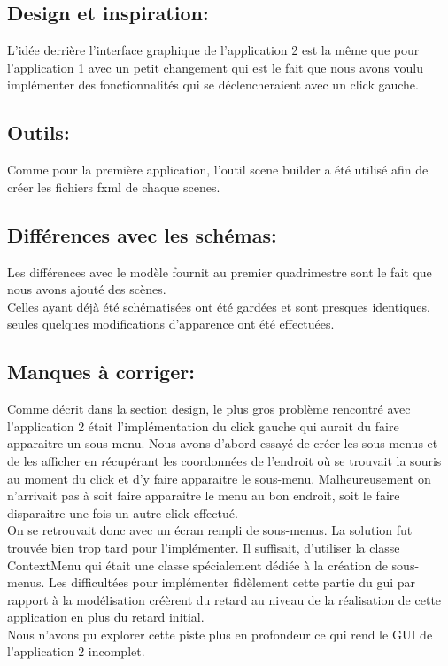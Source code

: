\documentclass[../rapport.tex]{subfiles}
\begin{document}
\subsection{Design et inspiration:}
    
L'idée derrière l'interface graphique de l'application 2 est la même que pour l'application 1 avec un petit changement qui est le fait 
que nous avons voulu implémenter des fonctionnalités qui se déclencheraient avec un click gauche.


\subsection{Outils:}

    Comme pour la première application, l'outil scene builder a été utilisé afin de créer les fichiers fxml de chaque scenes.

\subsection{Différences avec les schémas:}

    Les différences avec le modèle fournit au premier quadrimestre sont le fait que nous avons ajouté des scènes.\\
    Celles ayant déjà été schématisées 
    ont été gardées et sont presques identiques, seules quelques modifications d'apparence ont été effectuées.


\subsection{Manques à corriger:}

    Comme décrit dans la section design, le plus gros problème rencontré avec l'application 2 était l'implémentation du click gauche qui
    aurait du faire apparaitre un sous-menu. Nous avons d'abord essayé de créer les sous-menus et de les afficher en récupérant les coordonnées de 
    l'endroit où se trouvait la souris au moment du click et d'y faire apparaitre le sous-menu. Malheureusement on n'arrivait pas à 
    soit faire apparaitre le menu au bon endroit, soit le faire disparaitre une fois un autre click effectué.\\  
    On se retrouvait donc
    avec un écran rempli de sous-menus. La solution fut trouvée bien trop tard pour l'implémenter. Il suffisait, d'utiliser la classe
    ContextMenu qui était une classe spécialement dédiée à la création de sous-menus. Les difficultées pour implémenter fidèlement cette partie du gui par rapport à la modélisation créèrent du retard au niveau de la réalisation de cette application en plus du retard initial.\\
    Nous n'avons pu explorer cette piste plus en profondeur ce qui rend le GUI de l'application 2 incomplet.

    \newpage
\end{document}
